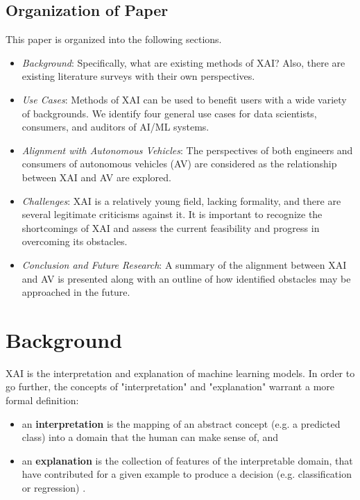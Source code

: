 \documentclass{IEEEtran}
\begin{document}
\subsection{Organization of Paper}

This paper is organized into the following sections.

\begin{itemize}
    \item\textit{Background}: Specifically, what are existing methods of XAI?  Also, there are existing literature surveys with their own perspectives.

    \item\textit{Use Cases}: Methods of XAI can be used to benefit users with a wide variety of backgrounds.  We identify four general use cases for data scientists, consumers, and auditors of AI/ML systems.

    \item\textit{Alignment with Autonomous Vehicles}: The perspectives of both engineers and consumers of autonomous vehicles (AV) are considered as the relationship between XAI and AV are explored.

    \item\textit{Challenges}: XAI is a relatively young field, lacking formality, and there are several legitimate criticisms against it.  It is important to recognize the shortcomings of XAI and assess the current feasibility and progress in overcoming its obstacles.

    \item\textit{Conclusion and Future Research}: A summary of the alignment between XAI and AV is presented along with an outline of how identified obstacles may be approached in the future.
\end{itemize}

\section{Background}

XAI is the interpretation and explanation of machine learning models.  In order to go further, the concepts of "interpretation" and "explanation" warrant a more formal definition:

\begin{itemize}
    \item an \textbf{interpretation} is the mapping of an abstract concept (e.g. a predicted class) into a domain that the human can make sense of, and
    \item an \textbf{explanation} is the collection of features of the interpretable domain, that have contributed for a given example to produce a decision (e.g. classification or regression) \cite{MONTAVON20181}.
\end{itemize}
\end{document}
